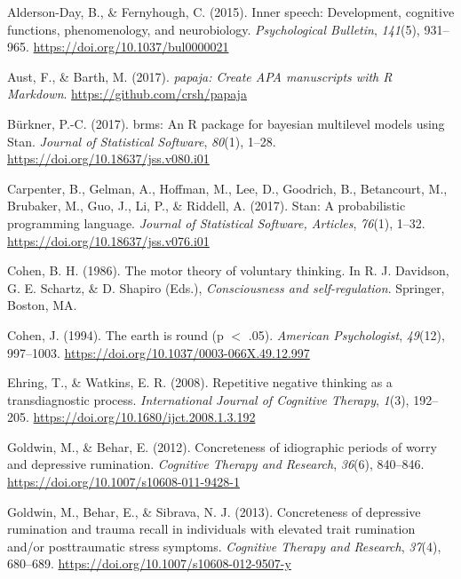 \documentclass[
  english,
  man, donotrepeattitle,floatsintext]{apa6}
\newlength{\cslhangindent}
\newenvironment{cslreferences}%
  {\setlength{\parindent}{0pt}%
  \everypar{\setlength{\hangindent}{\cslhangindent}}\ignorespaces}%
  {\par}
\begin{document}
\hypertarget{refs}{}
\begin{cslreferences}
\leavevmode\hypertarget{ref-alderson-day_inner_2015}{}%
Alderson-Day, B., \& Fernyhough, C. (2015). Inner speech: Development, cognitive functions, phenomenology, and neurobiology. \emph{Psychological Bulletin}, \emph{141}(5), 931--965. \url{https://doi.org/10.1037/bul0000021}

\leavevmode\hypertarget{ref-R-papaja}{}%
Aust, F., \& Barth, M. (2017). \emph{papaja: Create APA manuscripts with R Markdown}. \url{https://github.com/crsh/papaja}

\leavevmode\hypertarget{ref-R-brms}{}%
Bürkner, P.-C. (2017). brms: An R package for bayesian multilevel models using Stan. \emph{Journal of Statistical Software}, \emph{80}(1), 1--28. \url{https://doi.org/10.18637/jss.v080.i01}

\leavevmode\hypertarget{ref-carpenter_stan_2017}{}%
Carpenter, B., Gelman, A., Hoffman, M., Lee, D., Goodrich, B., Betancourt, M., Brubaker, M., Guo, J., Li, P., \& Riddell, A. (2017). Stan: A probabilistic programming language. \emph{Journal of Statistical Software, Articles}, \emph{76}(1), 1--32. \url{https://doi.org/10.18637/jss.v076.i01}

\leavevmode\hypertarget{ref-cohen_motor_1986}{}%
Cohen, B. H. (1986). The motor theory of voluntary thinking. In R. J. Davidson, G. E. Schartz, \& D. Shapiro (Eds.), \emph{Consciousness and self-regulation}. Springer, Boston, MA.

\leavevmode\hypertarget{ref-cohen_earth_1994}{}%
Cohen, J. (1994). The earth is round (p \(<\) .05). \emph{American Psychologist}, \emph{49}(12), 997--1003. \url{https://doi.org/10.1037/0003-066X.49.12.997}

\leavevmode\hypertarget{ref-ehring_repetitive_2008}{}%
Ehring, T., \& Watkins, E. R. (2008). Repetitive negative thinking as a transdiagnostic process. \emph{International Journal of Cognitive Therapy}, \emph{1}(3), 192--205. \url{https://doi.org/10.1680/ijct.2008.1.3.192}

\leavevmode\hypertarget{ref-goldwin_concreteness_2012}{}%
Goldwin, M., \& Behar, E. (2012). Concreteness of idiographic periods of worry and depressive rumination. \emph{Cognitive Therapy and Research}, \emph{36}(6), 840--846. \url{https://doi.org/10.1007/s10608-011-9428-1}

\leavevmode\hypertarget{ref-goldwin_concreteness_2013}{}%
Goldwin, M., Behar, E., \& Sibrava, N. J. (2013). Concreteness of depressive rumination and trauma recall in individuals with elevated trait rumination and/or posttraumatic stress symptoms. \emph{Cognitive Therapy and Research}, \emph{37}(4), 680--689. \url{https://doi.org/10.1007/s10608-012-9507-y}


\end{cslreferences}
\end{document}
